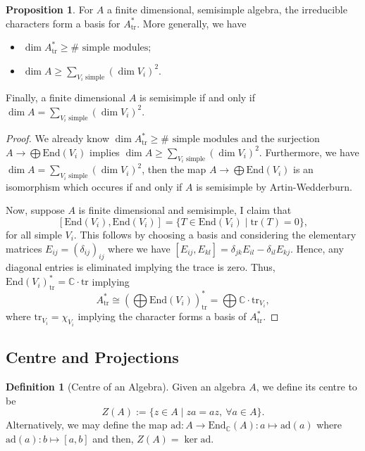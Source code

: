 \documentclass[]{article}
\theoremstyle{definition}
\theoremstyle{definition}
\newtheorem{definition}{Definition}[section]
\newtheorem{proposition}{Proposition}[section]
\begin{document}
\begin{proposition}
  For \(A\) a finite dimensional, semisimple algebra, the irreducible characters 
  form a basis for \(A^*_{\text{tr}}\). More generally, we have 
  \begin{itemize}
    \item \(\dim A^*_{\text{tr}} \ge \# \text{ simple modules}\);
    \item \(\dim A \ge \sum_{V_i \text{ simple}}(\dim V_i)^2\).
  \end{itemize}
  Finally, a finite dimensional \(A\) is semisimple if and only if 
  \(\dim A = \sum_{V_i \text{ simple}}(\dim V_i)^2\).
\end{proposition}
\begin{proof}
  We already know \(\dim A^*_{\text{tr}} \ge \# \text{ simple modules}\) and 
  the surjection \(A \to \bigoplus \text{End}(V_i)\) implies 
  \(\dim A \ge \sum_{V_i \text{ simple}}(\dim V_i)^2\). Furthermore, 
  we have \(\dim A = \sum_{V_i \text{ simple}}(\dim V_i)^2\), then the map 
  \(A \to \bigoplus \text{End}(V_i)\) is an isomorphism which occures if 
  and only if \(A\) is semisimple by Artin-Wedderburn.

  Now, suppose \(A\) is finite dimensional and semisimple, I claim that 
  \[[\text{End}(V_i), \text{End}(V_i)] = \{T \in \text{End}(V_i) \mid \text{tr}(T) = 0\},\]
  for all simple \(V_i\). This follows by choosing a basis and considering 
  the elementary matrices \(E_{ij} = (\delta_{ij})_{ij}\) where we have 
  \([E_{ij}, E_{kl}] = \delta_{jk}E_{il} - \delta_{il}E_{kj}\). Hence, 
  any diagonal entries is eliminated implying the trace is zero.
  Thus, \(\text{End}(V_i)^*_{\text{tr}} = \mathbb{C} \cdot \text{tr}\) implying 
  \[A^*_{\text{tr}} \cong \left(\bigoplus \text{End}(V_i)\right)^*_{\text{tr}} = 
    \bigoplus \mathbb{C} \cdot \text{tr}_{V_i},\]
  where \(\text{tr}_{V_i} = \chi_{V_i}\) implying the character forms a 
  basis of \(A^*_{\text{tr}}\).
\end{proof}

\subsection{Centre and Projections}

\begin{definition}[Centre of an Algebra]
  Given an algebra \(A\), we define its centre to be 
  \[Z(A) := \{z \in A \mid za = az, \ \forall a \in A\}.\]
  Alternatively, we may define the map \(\text{ad} : A \to \text{End}_{\mathbb{C}}(A) : a 
  \mapsto \text{ad}(a)\) where \(\text{ad}(a) : b \mapsto [a, b]\) and then, 
  \(Z(A) = \ker \text{ad}\).
\end{definition}
\end{document}
